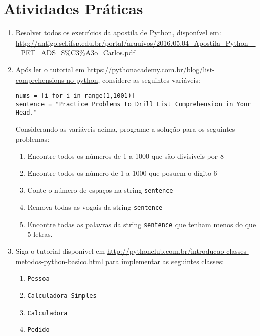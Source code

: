 \documentclass{article}
\begin{document}
\section{Atividades Práticas}

\begin{enumerate}
    \item Resolver todos os exercícios da apostila de Python, disponível em: \url{http://antigo.scl.ifsp.edu.br/portal/arquivos/2016.05.04_Apostila\_Python\_-\_PET\_ADS\_S\%C3\%A3o_Carlos.pdf}
    \item Após ler o tutorial em \url{https://pythonacademy.com.br/blog/list-comprehensions-no-python}, considere as seguintes variáveis:
    
    \texttt{nums = [i for i in range(1,1001)]}\\
    \texttt{sentence = "Practice Problems to Drill List Comprehension in Your Head."}
    
    Considerando as variáveis acima, programe a solução para os seguintes problemas:
    
    \begin{enumerate}
    \item Encontre todos os números de 1 a 1000 que são divisíveis por 8
    \item Encontre todos os número de 1 a 1000 que posuem o dígito 6
    \item Conte o número de espaços na string \texttt{sentence}
    \item Remova todas as vogais da string \texttt{sentence}
    \item Encontre todas as palavras da string \texttt{sentence} que tenham menos do que 5 letras.
    \end{enumerate}
    
    \item Siga o tutorial disponível em \url{http://pythonclub.com.br/introducao-classes-metodos-python-basico.html} para implementar as seguintes classes:
    \begin{enumerate}
        \item \texttt{Pessoa}
        \item \texttt{Calculadora Simples}
        \item \texttt{Calculadora}
        \item \texttt{Pedido}
    \end{enumerate}
    

\end{enumerate}

%
%
\end{document}
